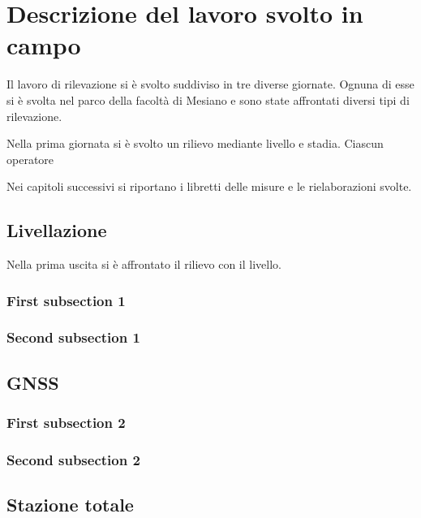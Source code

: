 \chapter{Descrizione del lavoro svolto in campo}
Il lavoro di rilevazione si è svolto suddiviso in tre diverse giornate.
Ognuna di esse si è svolta nel parco della facoltà di Mesiano e sono state affrontati diversi tipi di rilevazione. 

Nella prima giornata si è svolto un rilievo mediante livello e stadia. 
Ciascun operatore 

Nei capitoli successivi si riportano i libretti delle misure e le rielaborazioni svolte.

\section{Livellazione}
Nella prima uscita si è affrontato il rilievo con il livello. 
\subsection{First subsection 1} 
\subsection{Second subsection 1}
\section{GNSS}
\subsection{First subsection 2} 
\subsection{Second subsection 2}
\section{Stazione totale}
